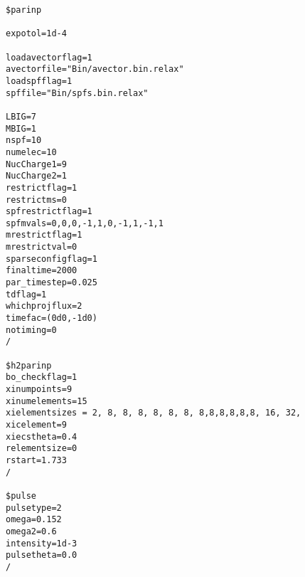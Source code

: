 {\footnotesize \begin{verbatim}
$parinp

expotol=1d-4

loadavectorflag=1
avectorfile="Bin/avector.bin.relax"
loadspfflag=1
spffile="Bin/spfs.bin.relax"

LBIG=7
MBIG=1
nspf=10
numelec=10
NucCharge1=9
NucCharge2=1
restrictflag=1
restrictms=0
spfrestrictflag=1
spfmvals=0,0,0,-1,1,0,-1,1,-1,1
mrestrictflag=1
mrestrictval=0
sparseconfigflag=1
finaltime=2000
par_timestep=0.025
tdflag=1
whichprojflux=2
timefac=(0d0,-1d0)
notiming=0
/

$h2parinp
bo_checkflag=1
xinumpoints=9
xinumelements=15
xielementsizes = 2, 8, 8, 8, 8, 8, 8, 8,8,8,8,8,8, 16, 32, 
xicelement=9
xiecstheta=0.4
relementsize=0
rstart=1.733
/

$pulse
pulsetype=2
omega=0.152
omega2=0.6
intensity=1d-3
pulsetheta=0.0
/
\end{verbatim}}

